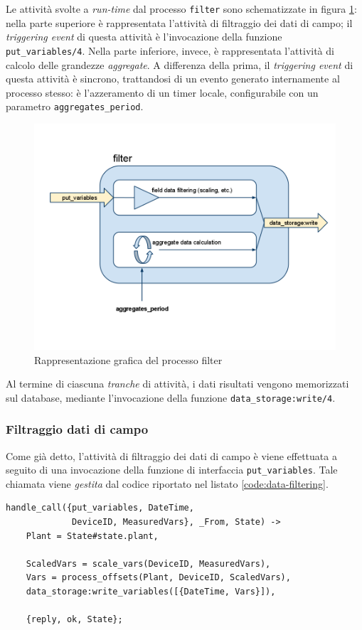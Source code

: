 %
Le attivit\`a svolte a \emph{run-time} dal processo \texttt{filter} sono schematizzate in 
figura \ref{filter}: nella parte superiore \`e rappresentata l'attivit\`a di filtraggio 
dei dati di campo; il \emph{triggering event} di questa attivit\`a \`e l'invocazione della 
funzione \texttt{put\_variables/4}.
%
Nella parte inferiore, invece, \`e rappresentata l'attivit\`a di calcolo delle grandezze 
\emph{aggregate}. A differenza della prima, il \emph{triggering event} di questa attivit\`a
\`e sincrono, trattandosi di un evento generato internamente al processo stesso: 
\`e l'azzeramento di un timer locale, configurabile con un parametro \texttt{aggregates\_period}.
%

%
\begin{figure}[!h]
\centering
\includegraphics[width=380pt]{img/filter.png}
\caption{Rappresentazione grafica del processo filter}
\label{filter}
\end{figure}
%
Al termine di ciascuna \emph{tranche} di attivit\`a, i dati risultati vengono memorizzati sul 
database, mediante l'invocazione della funzione \texttt{data\_storage:write/4}.
%

%
\subsubsection{Filtraggio dati di campo}
%
Come gi\`a detto, l'attivit\`a di filtraggio dei dati di campo \`e viene effettuata a seguito 
di una invocazione della funzione di interfaccia \texttt{put\_variables}. Tale chiamata viene
\emph{gestita} dal codice riportato nel listato \ref{code:data-filtering}.
%
\begin{lstlisting}[caption={Filtraggio dei dati di campo}, label={code:data-filtering},frame=trBL]
handle_call({put_variables, DateTime, 
             DeviceID, MeasuredVars}, _From, State) ->
    Plant = State#state.plant,

    ScaledVars = scale_vars(DeviceID, MeasuredVars),
    Vars = process_offsets(Plant, DeviceID, ScaledVars),
    data_storage:write_variables([{DateTime, Vars}]),

    {reply, ok, State};
\end{lstlisting}
%

